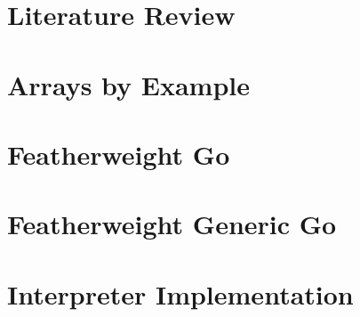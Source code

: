 \documentclass{article}
\begin{document}

\clearpage

\tableofcontents
\clearpage



\section{Literature Review}

\section{Arrays by Example}

\section{Featherweight Go}

\section{Featherweight Generic Go}

\section{Interpreter Implementation}

\clearpage
{}
\printbibliography
\end{document}

